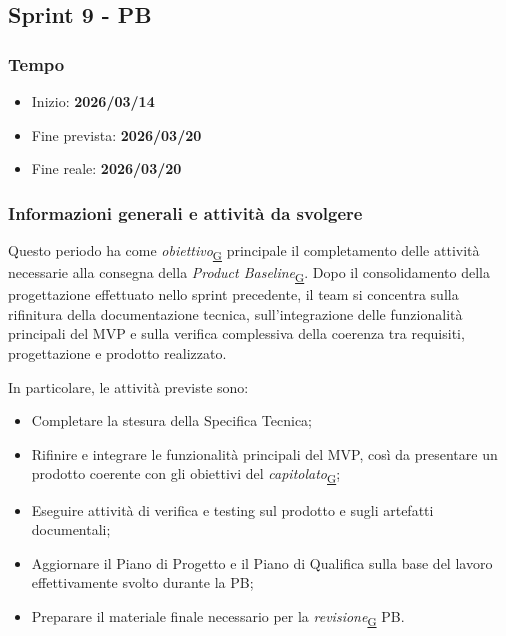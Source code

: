 \documentclass[a4paper,12pt]{article}
\begin{document}
\subsection{Sprint 9 - PB}{
    \subsubsection{Tempo}{
        \begin{itemize}
            \item[] Inizio: \textbf{2026/03/14} 
            \item[] Fine prevista: \textbf{2026/03/20} 
            \item[] Fine reale: \textbf{2026/03/20} 
        \end{itemize}
    }

    \subsubsection{Informazioni generali e attività da svolgere}{
        Questo periodo ha come \textit{obiettivo}\textsubscript{\href{https://atlasteam9.github.io/Atlas/glossario.html\#Obiettivo}{G}} principale il completamento delle attività necessarie alla consegna della \textit{Product Baseline}\textsubscript{\href{https://atlasteam9.github.io/Atlas/glossario.html\#Baseline}{G}}. Dopo il consolidamento della progettazione effettuato nello sprint precedente, il team si concentra sulla rifinitura della documentazione tecnica, sull'integrazione delle funzionalità principali del MVP e sulla verifica complessiva della coerenza tra requisiti, progettazione e prodotto realizzato.
    }
            
    \noindent In particolare, le attività previste sono:
            \begin{itemize}
                \item Completare la stesura della Specifica Tecnica;
                \item Rifinire e integrare le funzionalità principali del MVP, così da presentare un prodotto coerente con gli obiettivi del \textit{capitolato}\textsubscript{\href{https://atlasteam9.github.io/Atlas/glossario.html\#Capitolato}{G}};
                \item Eseguire attività di verifica e testing sul prodotto e sugli artefatti documentali;
                \item Aggiornare il Piano di Progetto e il Piano di Qualifica sulla base del lavoro effettivamente svolto durante la PB;
                \item Preparare il materiale finale necessario per la \textit{revisione}\textsubscript{\href{https://atlasteam9.github.io/Atlas/glossario.html\#Revisione}{G}} PB.
            \end{itemize}
        }
\end{document}
